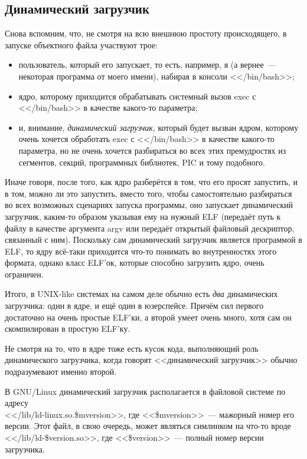 \subsection{Динамический загрузчик}
Снова вспомним, что, не смотря на всю внешнюю простоту происходящего, в запуске объектного файла участвуют трое:
\begin{itemize}
    \item пользователь, который его запускает, то есть, например, я (а вернее~--- некоторая программа от моего имени), набирая в консоли <</bin/bash>>;
    \item ядро, которому приходится обрабатывать системный вызов exec с <</bin/bash>> в качестве какого-то параметра;
    \item и, внимание, \emph{динамический загрузчик}, который будет вызван ядром, которому очень хочется обработать exec с <</bin/bash>> в качестве какого-то параметра, но не очень хочется разбираться во всех этих премудростях из сегментов, секций, программных библиотек, PIC и тому подобного.
\end{itemize}

Иначе говоря, после того, как ядро разберётся в том, что его просят запустить, и в том, можно ли это запустить, вместо того, чтобы самостоятельно разбираться во всех возможных сценариях запуска программы, оно запускает динамический загрузчик, каким-то образом указывая ему на нужный ELF (передаёт путь к файлу в качестве аргумента argv или передаёт открытый файловый дескриптор, связанный с ним).
Поскольку сам динамический загрузчик является программой в ELF, то ядру всё-таки приходится что-то понимать во внутренностях этого формата, однако класс ELF'ок, которые способно загрузить ядро, очень ограничен.

Итого, в UNIX-like системах на самом деле обычно есть \emph{два} динамических загрузчика: один в ядре, и ещё один в юзерспейсе.
Причём сил первого достаточно на очень простые ELF'ки, а второй умеет очень много, хотя сам он скомпилирован в простую ELF'ку.

Не смотря на то, что в ядре тоже есть кусок кода, выполняющий роль динамического загрузчика, когда говорят <<динамический загрузчик>> обычно подразумевают именно второй.

В GNU/Linux динамический загрузчик располагается в файловой системе по адресу\\<</lib/ld-linux.so.\$mversion>>, где <<\$mversion>>~--- мажорный номер его версии.
Этот файл, в свою очередь, может являться симлинком на что-то вроде <</lib/ld-\$version.so>>, где <<\$version>>~--- полный номер версии загрузчика.

